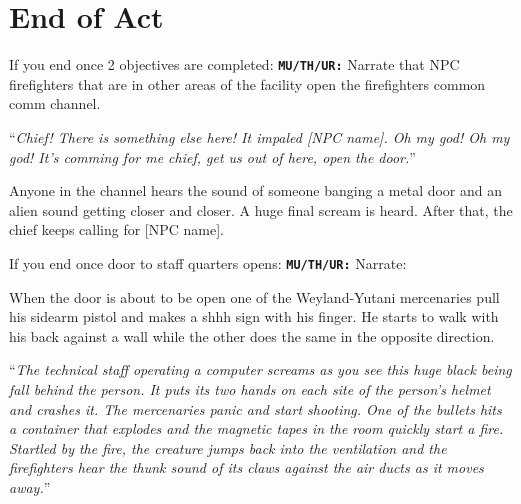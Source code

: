 \newsect

\section{End of Act}




\begin{rpg-commentbox}{If you end once 2 objectives are completed:}
    \texttt{\textbf{MU/TH/UR:}} Narrate that NPC firefighters that are in other areas of the facility open the firefighters common comm channel. 

    ``\textit{Chief! There is something else here! It impaled [NPC name]. Oh my god! Oh my god! It's comming for me chief, get us out of here, open the door.}''

    Anyone in the channel hears the sound of someone banging a metal door and an alien sound getting closer and closer. A huge final scream is heard. After that, the chief keeps calling for [NPC name].
\end{rpg-commentbox}



\begin{rpg-commentbox}{If you end once door to staff quarters opens:}
    \texttt{\textbf{MU/TH/UR:}} Narrate:

    When the door is about to be open one of the Weyland-Yutani mercenaries pull his sidearm pistol and makes a shhh sign with his finger. He starts to walk with his back against a wall while the other does the same in the opposite direction.
    
    ``\textit{The technical staff operating a computer screams as you see this huge black being fall behind the person. It puts its two hands on each site of the person's helmet and crashes it. The mercenaries panic and start shooting. One of the bullets hits a container that explodes and the magnetic tapes in the room quickly start a fire. Startled by the fire, the creature jumps back into the ventilation and the firefighters hear the thunk sound of its claws against the air ducts as it moves away.}''
\end{rpg-commentbox}